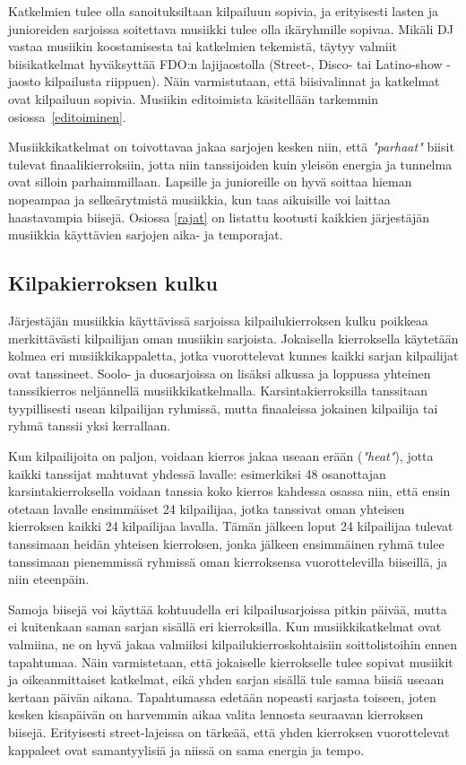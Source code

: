 \documentclass[12pt, a4paper, oneside]{article}
\begin{document}
Katkelmien tulee olla sanoituksiltaan kilpailuun sopivia,
ja erityisesti lasten ja junioreiden sarjoissa soitettava musiikki tulee olla ikäryhmille sopivaa.
Mikäli DJ vastaa musiikin koostamisesta tai katkelmien tekemistä,
täytyy valmiit biisikatkelmat hyväksyttää FDO:n lajijaostolla (Street-, Disco- tai Latino-show -jaosto kilpailusta riippuen).
Näin varmistutaan,
että biisivalinnat ja katkelmat ovat kilpailuun sopivia.
Musiikin editoimista käsitellään tarkemmin osiossa~\ref{editoiminen}.

Musiikkikatkelmat on toivottavaa jakaa sarjojen kesken niin,
että \textit{"parhaat"} biisit tulevat finaalikierroksiin,
jotta niin tanssijoiden kuin yleisön energia ja tunnelma ovat silloin parhaimmillaan.
Lapsille ja junioreille on hyvä soittaa hieman nopeampaa ja selkeärytmistä musiikkia,
kun taas aikuisille voi laittaa haastavampia biisejä.
Osiossa \ref{rajat} on listattu kootusti kaikkien järjestäjän musiikkia käyttävien sarjojen aika- ja temporajat.

\subsection{Kilpakierroksen kulku}

Järjestäjän musiikkia käyttävissä sarjoissa kilpailukierroksen kulku poikkeaa merkittävästi kilpailijan oman musiikin sarjoista.
Jokaisella kierroksella käytetään kolmea eri musiikkikappaletta,
jotka vuorottelevat kunnes kaikki sarjan kilpailijat ovat tanssineet.
Soolo- ja duosarjoissa on lisäksi alkussa ja loppussa yhteinen tanssikierros neljännellä musiikkikatkelmalla.
Karsintakierroksilla tanssitaan tyypillisesti usean kilpailijan ryhmissä,
mutta finaaleissa jokainen kilpailija tai ryhmä tanssii yksi kerrallaan.

Kun kilpailijoita on paljon,
voidaan kierros jakaa useaan erään (\textit{"heat"}),
jotta kaikki tanssijat mahtuvat yhdessä lavalle: esimerkiksi 48 osanottajan karsintakierroksella voidaan tanssia koko kierros kahdessa osassa niin,
että ensin otetaan lavalle ensimmäiset 24 kilpailijaa,
jotka tanssivat oman yhteisen kierroksen kaikki 24 kilpailijaa lavalla.
Tämän jälkeen loput 24 kilpailijaa tulevat tanssimaan heidän yhteisen kierroksen,
jonka jälkeen ensimmäinen ryhmä tulee tanssimaan pienemmissä ryhmissä oman kierroksensa vuorottelevilla biiseillä,
ja niin eteenpäin.

Samoja biisejä voi käyttää kohtuudella eri kilpailusarjoissa pitkin päivää,
mutta ei kuitenkaan saman sarjan sisällä eri kierroksilla.
Kun musiikkikatkelmat ovat valmiina,
ne on hyvä jakaa valmiiksi kilpailukierroskohtaisiin soittolistoihin ennen tapahtumaa.
Näin varmistetaan,
että jokaiselle kierrokselle tulee sopivat musiikit ja oikeanmittaiset katkelmat,
eikä yhden sarjan sisällä tule samaa biisiä useaan kertaan päivän aikana.
Tapahtumassa edetään nopeasti sarjasta toiseen,
joten kesken kisapäivän on harvemmin aikaa valita lennosta seuraavan kierroksen biisejä.
Erityisesti street-lajeissa on tärkeää,
että yhden kierroksen vuorottelevat kappaleet ovat samantyylisiä ja niissä on sama energia ja tempo.
\end{document}
